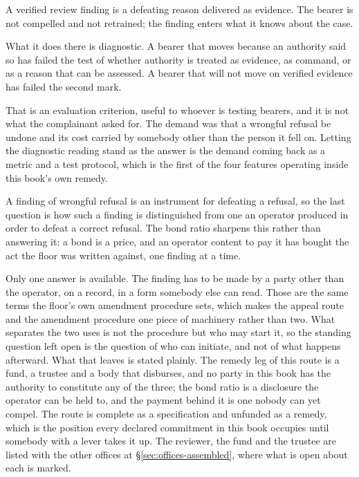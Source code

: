 
A verified review finding is a defeating reason delivered as evidence. The bearer is not compelled and not retrained; the finding enters what it knows about the case.

What it does there is diagnostic. A bearer that moves because an authority said so has failed the test of whether authority is treated as evidence, as command, or as a reason that can be assessed. A bearer that will not move on verified evidence has failed the second mark.

That is an evaluation criterion, useful to whoever is testing bearers, and it is not what the complainant asked for. The demand was that a wrongful refusal be undone and its cost carried by somebody other than the person it fell on. Letting the diagnostic reading stand as the answer is the demand coming back as a metric and a test protocol, which is the first of the four features operating inside this book's own remedy.


A finding of wrongful refusal is an instrument for defeating a refusal, so the last question is how such a finding is distinguished from one an
operator produced in order to defeat a correct refusal. The bond ratio sharpens this rather than answering it: a bond is a price, and an operator content to pay it has bought the act the floor was written against, one finding at a time.

Only one answer is available. The finding has to be made by a party other than the operator, on a record, in a form somebody else can read. Those are the same terms the floor's own amendment procedure sets, which makes the appeal route and the amendment procedure one piece of machinery rather than two. What separates the two uses is not the procedure but who may start it, so the standing question left open is the question of who can initiate, and not of what happens afterward. What that leaves is stated plainly. The remedy leg of this route is a fund, a trustee and a body that disburses, and no party in this book has the authority to constitute any of the three; the bond ratio is a disclosure the operator can be held to, and the payment behind it is one nobody can yet compel. The route is complete as a specification and unfunded as a remedy, which is the position every declared commitment in this book occupies until somebody with a lever takes it up. The reviewer, the fund and the trustee are listed with the other offices at §\ref{sec:offices-assembled}, where what is open about each is marked.

